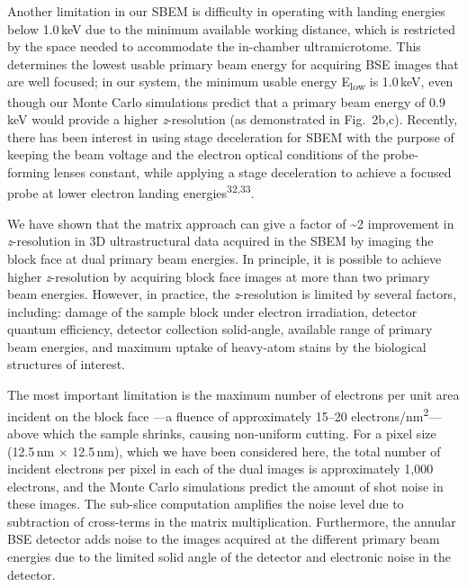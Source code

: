 \documentclass{article}
\newcommand{\cit}[1]{\textsuperscript{#1}}
\begin{document}
Another limitation in our SBEM is difficulty in operating with landing energies below 1.0\,keV due to the minimum available working distance, which is restricted by the space needed to accommodate the in-chamber ultramicrotome. This determines the lowest usable primary beam energy for acquiring BSE images that are well focused; in our system, the minimum usable energy E\textsubscript{low} is 1.0\,keV, even though our Monte Carlo simulations predict that a primary beam energy of 0.9\,keV would provide a higher \emph{z}-resolution (as demonstrated in Fig.~2b,c). Recently, there has been interest in using stage deceleration for SBEM with the purpose of keeping the beam voltage and the electron optical conditions of the probe-forming lenses constant, while applying a stage deceleration to achieve a focused probe at lower electron landing energies\cit{32,33}.

We have shown that the matrix approach can give a factor of \textasciitilde2 improvement in \emph{z}-resolution in 3D ultrastructural data acquired in the SBEM by imaging the block face at dual primary beam energies. In principle, it is possible to achieve higher \emph{z}-resolution by acquiring block face images at more than two primary beam energies. However, in practice, the \emph{z}-resolution is limited by several factors, including: damage of the sample block under electron irradiation, detector quantum efficiency, detector collection solid-angle, available range of primary beam energies, and maximum uptake of heavy-atom stains by the biological structures of interest.

The most important limitation is the maximum number of electrons per unit area incident on the block face —a fluence of approximately 15–20 electrons/nm\textsuperscript{2}— above which the sample shrinks, causing non-uniform cutting. For a pixel size (12.5\,nm × 12.5\,nm), which we have been considered here, the total number of incident electrons per pixel in each of the dual images is approximately 1,000 electrons, and the Monte Carlo simulations predict the amount of shot noise in these images. The sub-slice computation amplifies the noise level due to subtraction of cross-terms in the matrix multiplication. Furthermore, the annular BSE detector adds noise to the images acquired at the different primary beam energies due to the limited solid angle of the detector and electronic noise in the detector.
\end{document}
